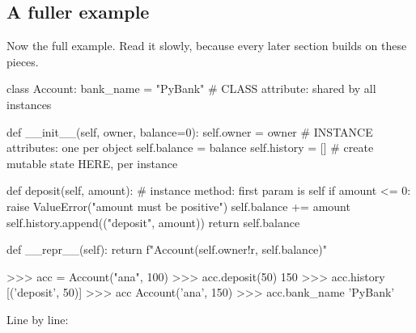 \documentclass[10pt,a4paper]{article}
\begin{document}
\subsection{A fuller example}
Now the full example. Read it slowly, because every later section builds on these pieces.
\begin{pycode}
class Account:
    bank_name = "PyBank"          # CLASS attribute: shared by all instances

    def __init__(self, owner, balance=0):
        self.owner = owner        # INSTANCE attributes: one per object
        self.balance = balance
        self.history = []         # create mutable state HERE, per instance

    def deposit(self, amount):    # instance method: first param is self
        if amount <= 0:
            raise ValueError("amount must be positive")
        self.balance += amount
        self.history.append(("deposit", amount))
        return self.balance

    def __repr__(self):
        return f"Account({self.owner!r}, {self.balance})"
\end{pycode}
\begin{txtcode}
>>> acc = Account("ana", 100)
>>> acc.deposit(50)
150
>>> acc.history
[('deposit', 50)]
>>> acc
Account('ana', 150)
>>> acc.bank_name
'PyBank'
\end{txtcode}
Line by line:
\end{document}
